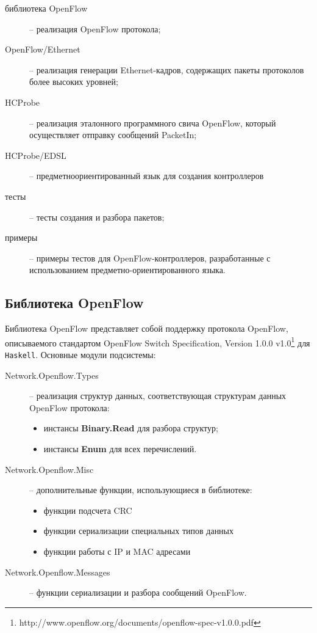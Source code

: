 \documentclass[9pt,a4paper]{article}
\begin{document}
\begin{description}
    \item[библиотека OpenFlow] -- реализация OpenFlow протокола;
    \item[OpenFlow/Ethernet] -- реализация генерации Ethernet-кадров, содержащих
      пакеты протоколов более высоких уровней;
    \item[HCProbe] -- реализация эталонного программного свича OpenFlow, который
      осуществляет отправку сообщений PacketIn;
    \item[HCProbe/EDSL] -- предметноориентированный язык для создания
      контроллеров
    \item[тесты] -- тесты создания и разбора пакетов;
    \item[примеры] -- примеры тестов для OpenFlow-контроллеров, разработанные с
      использованием предметно-ориентированного языка.
\end{description}


\subsection{Библиотека OpenFlow}

Библиотека OpenFlow представляет собой поддержку протокола OpenFlow,
описываемого стандартом OpenFlow Switch Specification, Version 1.0.0
v1.0\footnote{http://www.openflow.org/documents/openflow-spec-v1.0.0.pdf} для
\texttt{Haskell}. Основные модули подсистемы:

\begin{description}
    \item[Network.Openflow.Types] -- реализация структур данных, соответствующая
      структурам данных OpenFlow протокола:
        \begin{itemize}
            \item инстансы \textbf{Binary.Read} для разбора структур;
            \item инстансы \textbf{Enum} для всех перечислений.
        \end{itemize}
    \item[Network.Openflow.Misc] -- дополнительные функции, использующиеся в
      библиотеке:
        \begin{itemize}
            \item функции подсчета CRC
            \item функции сериализации специальных типов данных
            \item функции работы с IP и MAC адресами
        \end{itemize}
    \item[Network.Openflow.Messages] -- функции сериализации и разбора сообщений
      OpenFlow.
\end{description}
\end{document}
